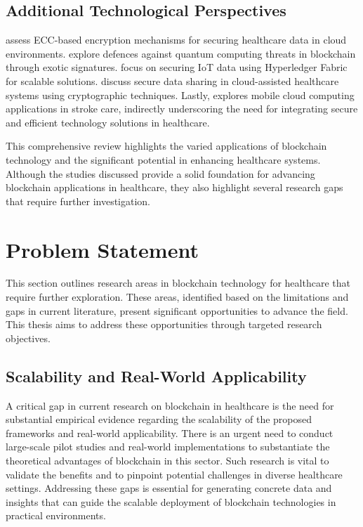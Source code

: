 \documentclass[cic,tc,english]{iiufrgs}
\begin{document}
    \subsection{Additional Technological Perspectives} \citet{Hema2019} assess ECC-based encryption mechanisms for securing healthcare data in cloud environments. \citet{Naz2024} explore defences against quantum computing threats in blockchain through exotic signatures. \citet{Eghmazi2024} focus on securing IoT data using Hyperledger Fabric for scalable solutions. \citet{XuChang2019} discuss secure data sharing in cloud-assisted healthcare systems using cryptographic techniques. Lastly, \citet{Karaca2019} explores mobile cloud computing applications in stroke care, indirectly underscoring the need for integrating secure and efficient technology solutions in healthcare.

    This comprehensive review highlights the varied applications of blockchain technology and the significant potential in enhancing healthcare systems. Although the studies discussed provide a solid foundation for advancing blockchain applications in healthcare, they also highlight several research gaps that require further investigation.

\section{Problem Statement}

    This section outlines research areas in blockchain technology for healthcare that require further exploration. These areas, identified based on the limitations and gaps in current literature, present significant opportunities to advance the field. This thesis aims to address these opportunities through targeted research objectives.

    \subsection{Scalability and Real-World Applicability} 
        A critical gap in current research on blockchain in healthcare is the need for substantial empirical evidence regarding the scalability of the proposed frameworks and real-world applicability. There is an urgent need to conduct large-scale pilot studies and real-world implementations to substantiate the theoretical advantages of blockchain in this sector. Such research is vital to validate the benefits and to pinpoint potential challenges in diverse healthcare settings. Addressing these gaps is essential for generating concrete data and insights that can guide the scalable deployment of blockchain technologies in practical environments.
\end{document}
